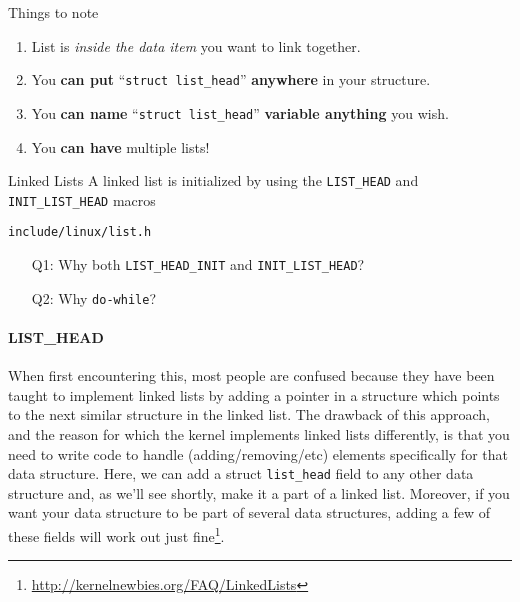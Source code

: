 \begin{frame}[fragile=singleslide]
  \begin{block}{Things to note}
    \begin{enumerate}
    \item List is \emph{inside the data item} you want to link together.
    \item You \textbf{can put} ``\verb|struct list_head|'' \textbf{anywhere} in your structure.
    \item You \textbf{can name} ``\verb|struct list_head|'' \textbf{variable anything} you wish.
    \item You \textbf{can have} multiple lists!
    \end{enumerate}
  \end{block}
\end{frame}

\begin{frame}[fragile=singleslide]{Linked Lists}
  A linked list is initialized by using the \texttt{LIST\_HEAD} and
  \texttt{INIT\_LIST\_HEAD} macros
  \begin{block}{\texttt{include/linux/list.h}}%
    \begin{center}
    \end{center}
  \end{block}
  \begin{itemize}
  \item[Q1:] Why both \texttt{LIST\_HEAD\_INIT} and \texttt{INIT\_LIST\_HEAD}?
  \item[Q2:] Why \texttt{do-while}?
  \end{itemize}
\end{frame}

\paragraph{LIST\_HEAD}

When first encountering this, most people are confused because they have been taught to
implement linked lists by adding a pointer in a structure which points to the next similar
structure in the linked list. The drawback of this approach, and the reason for which the
kernel implements linked lists differently, is that you need to write code to handle
(adding/removing/etc) elements specifically for that data structure. Here, we can add a
struct \texttt{list\_head} field to any other data structure and, as we'll see shortly, make
it a part of a linked list. Moreover, if you want your data structure to be part of
several data structures, adding a few of these fields will work out just
fine\footnote{\url{http://kernelnewbies.org/FAQ/LinkedLists}}. 

